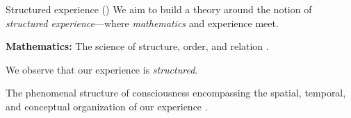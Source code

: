 \begin{frame}[label=intro2]{Structured experience (\SEP)}
 We aim to build a theory around the notion of 
{\em structured experience}---where {\em mathematics} and experience meet.  \vfill

{\bf Mathematics:}  The science of structure, order, and relation  \cite{davisMathematicalExperience1981}.  \vfill

We observe that our experience is {\em structured}. \vfill

	\begin{definition}
The phenomenal structure of consciousness  encompassing the spatial, temporal, and conceptual organization of our experience  \citep{VanGulick:2016aa}. 
	\end{definition}

	

\end{frame}


    

  


